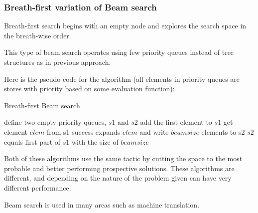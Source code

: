 \subsubsection{Breath-first variation of Beam search}

Breath-first search begins with an empty node and explores the search space in the breath-wise order. 

This type of beam search operates using few priority queues instead of tree structures as in previous approach. 

Here is the pseudo code for the algorithm (all elements in priority queues are stores with priority based on some evaluation function):

\begin{algorithm}
 	\caption{Breath-first Beam search}
	\label{alg:protrack}
	\begin{algorithmic}[1]
		\State define two empty priority queues, $s1$ and $s2$
		\State add the first element to $s1$
				\State get element $elem$ from s1
					\State	success
					\EndIf
					\State expands $elem$ and write $beamsize$-elements to s2
					\EndWhile
					\State $s2$ equals first part of $s1$ with the size of $beamsize$
					\EndWhile
	\end{algorithmic}
\end{algorithm}




\vspace{0.2 cm}
Both of these algorithms use the same tactic by cutting the space to the most probable and better performing prospective solutions. These algorithms are different, and depending on the nature of the problem given can have very different performance.

Beam search is used in many areas such as machine translation\cite{Koehn2007MOSEStranslationSystem}.






